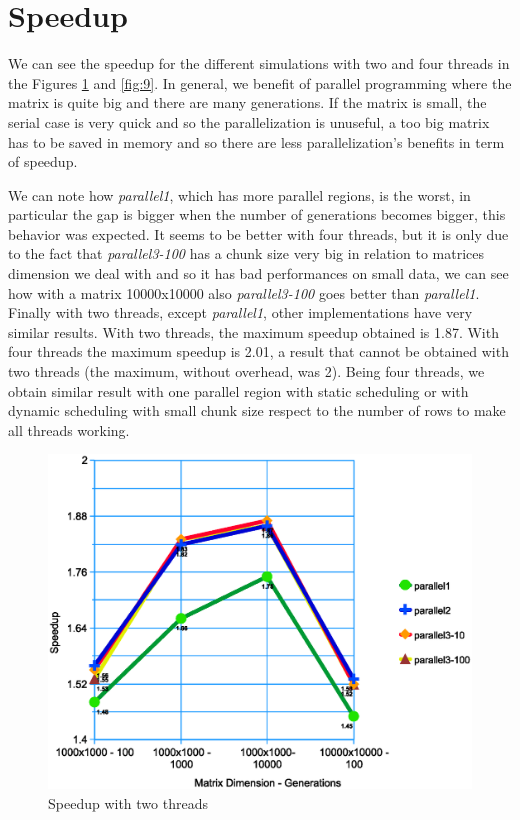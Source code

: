 \documentclass[a4paper,11pt,twoside]{report}
\begin{document}
\section{Speedup}

We can see the speedup for the different simulations with two and four threads in the Figures \ref{fig:8} and \ref{fig:9}. In general, we benefit of parallel programming where the matrix is quite big and there are many generations. If the matrix is small, the serial case is very quick and so the parallelization is unuseful, a too big matrix has to be saved in memory and so there are less parallelization's benefits in term of speedup.

\noindent We can note how \emph{parallel1}, which has more parallel regions, is the worst, in particular the gap is bigger when the number of generations becomes bigger, this behavior was expected. It seems to be better with four threads, but it is only due to the fact that \emph{parallel3-100} has a chunk size very big in relation to matrices dimension we deal with and so it has bad performances on small data, we can see how with a matrix 10000x10000 also \emph{parallel3-100} goes better than \emph{parallel1}. Finally with two threads, except \emph{parallel1}, other implementations have very similar results. With two threads, the maximum speedup obtained is 1.87.
With four threads the maximum speedup is 2.01, a result that cannot be obtained with two threads (the maximum, without overhead, was 2). Being four threads, we obtain similar result with one parallel region with static scheduling or with dynamic scheduling with small chunk size respect to the number of rows to make all threads working.
\begin{center}
\begin{figure}
	\centering
	\includegraphics[scale = 0.5]{2.eps}
	\caption{Speedup with two threads} \label{fig:8}
\end{figure}
\end{center}
\end{document}
